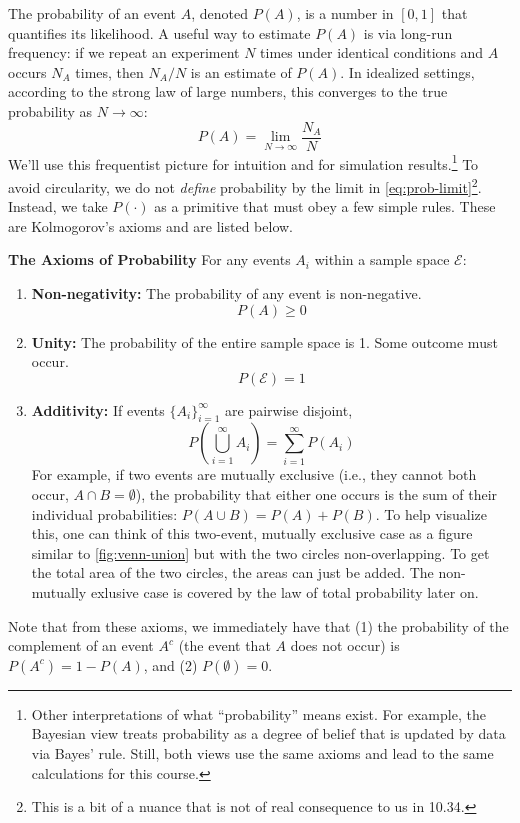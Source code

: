 The probability of an event $A$, denoted $P(A)$, is a number in $[0,1]$ that quantifies its likelihood. A useful way to estimate $P(A)$ is via long-run frequency: if we repeat an experiment $N$ times under identical conditions and $A$ occurs $N_A$ times, then $N_A/N$ is an estimate of $P(A)$. In idealized settings, according to the strong law of large numbers, this converges to the true probability as $N \to \infty$:
\begin{equation}
    P(A) = \lim_{N\to\infty} \frac{N_A}{N}
    \label{eq:prob-limit}
\end{equation}
We'll use this frequentist picture for intuition and for simulation results.\footnote{Other interpretations of what ``probability'' means exist. For example, the Bayesian view treats probability as a degree of belief that is updated by data via Bayes' rule. Still, both views use the same axioms and lead to the same calculations for this course.} To avoid circularity, we do not \emph{define} probability by the limit in \autoref{eq:prob-limit}\footnote{This is a bit of a nuance that is not of real consequence to us in 10.34.}. Instead, we take $P(\cdot)$ as a primitive that must obey a few simple rules. These are Kolmogorov's axioms and are listed below.
\begin{definitionBox}
    \textbf{The Axioms of Probability}
    For any events $A_i$ within a sample space $\mathcal{E}$:
    \begin{enumerate}
        \item \textbf{Non-negativity:} The probability of any event is non-negative.
        \begin{equation}
            P(A) \ge 0
        \end{equation}
        \item \textbf{Unity:} The probability of the entire sample space is 1. Some outcome must occur.
        \begin{equation}
            P(\mathcal{E}) = 1
        \end{equation}
        \item \textbf{Additivity:} If events $\{A_i\}_{i=1}^\infty$ are pairwise disjoint,
        \begin{equation}
          P\!\left(\bigcup_{i=1}^\infty A_i\right)=\sum_{i=1}^\infty P(A_i)
        \end{equation}
        For example, if two events are mutually exclusive (i.e., they cannot both occur, $A \cap B = \emptyset$), the probability that either one occurs is  the sum of their individual probabilities: $P(A \cup B) = P(A) + P(B)$. To help visualize this, one can think of this two-event, mutually exclusive case as a figure similar to \autoref{fig:venn-union} but with the two circles non-overlapping. To get the total area of the two circles, the areas can just be added. The non-mutually exlusive case is covered by the law of total probability later on.
    \end{enumerate}
\end{definitionBox}
Note that from these axioms, we immediately have that (1) the probability of the complement of an event $A^{c}$ (the event that $A$ does not occur) is $P(A^{c}) = 1 - P(A)$, and (2) $P(\emptyset) = 0$.
    

